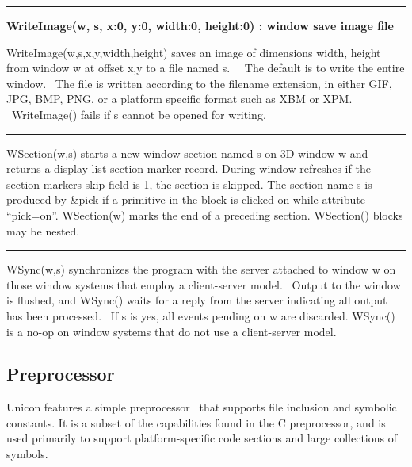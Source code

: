 \bigskip\hrule\vspace{0.1cm}
\noindent
{\bf WriteImage(w, s, x:0, y:0, width:0, height:0) : window
\hfill save image file}

\noindent
\textsf{WriteImage(w,s,x,y,width,height)} saves an image of dimensions
width, height from window w at offset \textsf{x,y} to a file named
\textsf{s}. \ \ The default is to write the entire window. \ The file
is written according to the filename extension, in either GIF, JPG,
BMP, PNG, or a platform specific format such as XBM or XPM.
\ \textsf{WriteImage()} fails if \textsf{s} cannot be opened for
writing.

\bigskip\hrule\vspace{0.1cm}

\noindent
\textsf{WSection(w,s)} starts a new window section named \textsf{s} on
3D window \textsf{w} and returns a display list section marker record.
During window refreshes if the section marker{\textquotesingle}s
\textsf{skip} field is 1, the section is skipped. The section name
\textsf{s} is produced by \textsf{\&pick} if a primitive in the block
is clicked on while attribute
\textsf{{\textquotedblleft}pick=on{\textquotedblright}}.
\textsf{WSection(w)} marks the end of a preceding section.
\textsf{WSection()} blocks may be nested.

\bigskip\hrule\vspace{0.1cm}

\noindent
\textsf{WSync(w,s)} synchronizes the program with the server attached to
window \textsf{w} on those window systems that employ a client-server
model. \ Output to the window is flushed, and \textsf{WSync()} waits
for a reply from the server indicating all output has been processed.
\ If \textsf{s} is \textsf{{\textquotedbl}yes{\textquotedbl}}, all
events pending on \textsf{w} are discarded. \textsf{WSync()} is a no-op
on window systems that do not use a client-server model.

\subsection{Preprocessor}
Unicon features a simple preprocessor \ that
supports file inclusion and symbolic constants. It is a subset of the
capabilities found in the C preprocessor, and is used primarily to
support platform-specific code sections and large collections of
symbols.


